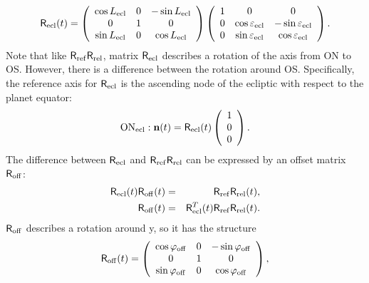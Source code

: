 \documentclass[a4paper]{article}
\renewcommand{\vec}[1]{\ensuremath \mathbf{#1}}
\newcommand{\mat}[1]{\ensuremath \mathsf{#1}}
\begin{document}
\begin{equation}\label{eq:rot_ecl}
\mat{R}_\mathrm{ecl}(t) = \left( \begin{array}{ccc}
\cos L_\mathrm{ecl} & 0 & -\sin L_\mathrm{ecl} \\
0 & 1 & 0 \\
\sin L_\mathrm{ecl} & 0 & \cos L_\mathrm{ecl} \end{array} \right)
\left( \begin{array}{ccc}
1 & 0 & 0 \\
0 & \cos\varepsilon_\mathrm{ecl} & -\sin\varepsilon_\mathrm{ecl} \\
0  & \sin\varepsilon_\mathrm{ecl} & \cos\varepsilon_\mathrm{ecl}
\end{array} \right).
\end{equation}
Note that like $\mat{R}_\mathrm{ref} \mat{R}_\mathrm{rel}$, matrix $\mat{R}_\mathrm{ecl}$ describes a rotation of the axis from ON to OS. However, there is a difference between the rotation around OS. Specifically, the reference axis for $\mat{R}_\mathrm{ecl}$ is the ascending node of the ecliptic with respect to the planet equator:
\begin{equation}
\mathrm{ON}_\mathrm{ecl}: \vec{n}(t) = \mat{R}_\mathrm{ecl}(t)
\left( \begin{array}{c} 1 \\ 0 \\ 0 \end{array} \right).
\end{equation}
The difference between $\mat{R}_\mathrm{ecl}$ and $\mat{R}_\mathrm{ref} \mat{R}_\mathrm{rel}$ can be expressed by an offset matrix $\mat{R}_\mathrm{off}$:
\begin{eqnarray}
\mat{R}_\mathrm{ecl}(t) \mat{R}_\mathrm{off}(t) &=& \mat{R}_\mathrm{ref} \mat{R}_\mathrm{rel}(t),\\
\mat{R}_\mathrm{off}(t) &=& \mat{R}^T_\mathrm{ecl}(t) \mat{R}_\mathrm{ref} \mat{R}_\mathrm{rel}(t).
\end{eqnarray}
$\mat{R}_\mathrm{off}$ describes a rotation around y, so it has the structure
\begin{equation}
\mat{R}_\mathrm{off}(t) = \left( \begin{array}{ccc}
\cos \varphi_\mathrm{off} & 0 & -\sin \varphi_\mathrm{off} \\
0 & 1 & 0 \\
\sin \varphi_\mathrm{off} & 0 & \cos \varphi_\mathrm{off} \end{array} \right),
\end{equation}
\end{document}
